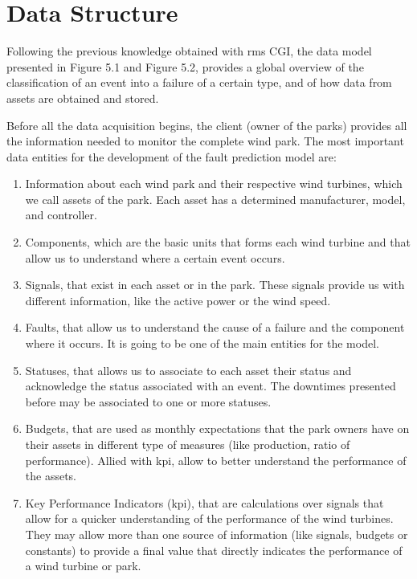 \section{Data Structure} 
\label{sub:if_you_use_this_template} 

Following the previous knowledge obtained with \acrshort{rms} CGI, the data model presented in Figure 5.1 and Figure 5.2, provides a global overview of the classification of an event into a failure of a certain type, and of how data from assets are obtained and stored.

Before all the data acquisition begins, the client (owner of the parks) provides all the information needed to monitor the complete wind park. The most important data entities for the development of the fault prediction model are:

\begin{enumerate}
    \item 
Information about each wind park and their respective wind turbines, which we call assets of the park. Each asset has a determined manufacturer, model, and controller.
    \item
Components, which are the basic units that forms each wind turbine and that allow us to understand where a certain event occurs.
    \item
Signals, that exist in each asset or in the park. These signals provide us with different information, like the active power or the wind speed.
    \item
Faults, that allow us to understand the cause of a failure and the component where it occurs. It is going to be one of the main entities for the model.
    \item
Statuses, that allows us to associate to each asset their status and acknowledge the status associated with an event. The downtimes presented before may be associated to one or more statuses.
    \item
Budgets, that are used as monthly expectations that the park owners have on their assets in different type of measures (like production, ratio of performance). Allied with \acrshort{kpi}, allow to better understand the performance of the assets.
    \item
Key Performance Indicators (\acrshort{kpi}), that are calculations over signals that allow for a quicker understanding of the performance of the wind turbines. They may allow more than one source of information (like signals, budgets or constants) to provide a final value that directly indicates the performance of a wind turbine or park.
\end{enumerate}

